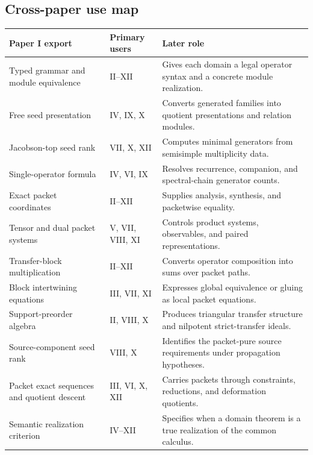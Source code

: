 \documentclass[11pt]{article}
\theoremstyle{definition}
\theoremstyle{remark}
\theoremstyle{definition}\newtheorem{example}[theorem]{Example}
\begin{document}
\subsection{Cross-paper use map}
\begin{center}
\begin{longtable}{@{}>{\raggedright\arraybackslash}p{}>{\raggedright\arraybackslash}p{}>{\raggedright\arraybackslash}p{}@{}}
\toprule
\textbf{Paper I export} & \textbf{Primary users} & \textbf{Later role}\\
\midrule
\endhead
Typed grammar and module equivalence & II--XII & Gives each domain a legal operator syntax and a concrete module realization.\\
Free seed presentation & IV, IX, X & Converts generated families into quotient presentations and relation modules.\\
Jacobson-top seed rank & VII, X, XII & Computes minimal generators from semisimple multiplicity data.\\
Single-operator formula & IV, VI, IX & Resolves recurrence, companion, and spectral-chain generator counts.\\
Exact packet coordinates & II--XII & Supplies analysis, synthesis, and packetwise equality.\\
Tensor and dual packet systems & V, VII, VIII, XI & Controls product systems, observables, and paired representations.\\
Transfer-block multiplication & II--XII & Converts operator composition into sums over packet paths.\\
Block intertwining equations & III, VII, XI & Expresses global equivalence or gluing as local packet equations.\\
Support-preorder algebra & II, VIII, X & Produces triangular transfer structure and nilpotent strict-transfer ideals.\\
Source-component seed rank & VIII, X & Identifies the packet-pure source requirements under propagation hypotheses.\\
Packet exact sequences and quotient descent & III, VI, X, XII & Carries packets through constraints, reductions, and deformation quotients.\\
Semantic realization criterion & IV--XII & Specifies when a domain theorem is a true realization of the common calculus.\\
\bottomrule
\end{longtable}
\end{center}
\end{document}
